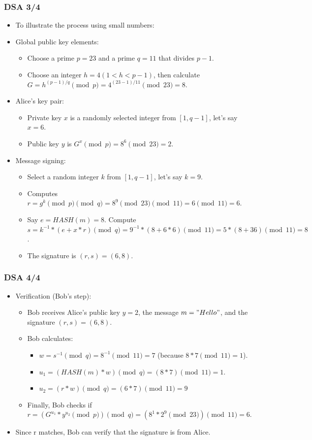 \documentclass{beamer}
\begin{document}
\begin{frame}
  \frametitle{DSA 3/4}
  \begin{itemize}
  \item To illustrate the process using small numbers:
  \item Global public key elements:
    \begin{itemize}
    \item Choose a prime $p = 23$ and a prime $q = 11$ that divides $p-1$.
    \item Choose an integer $h = 4 (1 < h < p-1)$, then calculate $G = h^{(p-1)/q} \pmod{p} = 4^{(23-1)/11} \pmod{23} = 8$.
    \end{itemize}
  \item Alice's key pair:
    \begin{itemize}
    \item Private key $x$ is a randomly selected integer from $[1, q-1]$, let's say $x = 6$.
    \item Public key $y$ is $G^x \pmod{p} = 8^6 \pmod{23} = 2$.
    \end{itemize}
  \item Message signing:
    \begin{itemize}
    \item Select a random integer $k$ from $[1, q-1]$, let's say $k = 9$.
    \item Computes $r = g^k \pmod{p} \pmod{q} = 8^9 \pmod{23} \pmod{11} = 6 \pmod{11} = 6$.
    \item Say $e = HASH(m) = 8$. Compute $s = k^{-1} * (e + x*r) \pmod{q} = 9^{-1} * (8 + 6*6) \pmod{11} = 5 * (8 + 36) \pmod{11} = 8$.
    \item The signature is $(r, s) = (6, 8)$.
    \end{itemize}
  \end{itemize}
\end{frame}

\begin{frame}
  \frametitle{DSA 4/4}
  \begin{itemize}
  \item Verification (Bob's step):
    \begin{itemize}
    \item Bob receives Alice's public key $y = 2$, the message $m = "Hello"$, and the signature $(r, s) = (6, 8)$.
    \item Bob calculates:
      \begin{itemize}
      \item $w = s^{-1} \pmod{q} = 8^{-1} \pmod{11} = 7$ (because $8*7 \pmod{11} = 1$).
      \item $u_1 = (HASH(m) * w) \pmod{q} = (8 * 7) \pmod{11} = 1$.
      \item $u_2 = (r * w) \pmod{q} = (6 * 7) \pmod{11} = 9$
      \end{itemize}
    \item Finally, Bob checks if $r = (G^{u_1} * y^{u_2} \pmod{p}) \pmod{q} = (8^1 * 2^9 \pmod{23}) \pmod{11} = 6$.
    \end{itemize}
  \item Since r matches, Bob can verify that the signature is from Alice.
  \end{itemize}
\end{frame}
\end{document}
